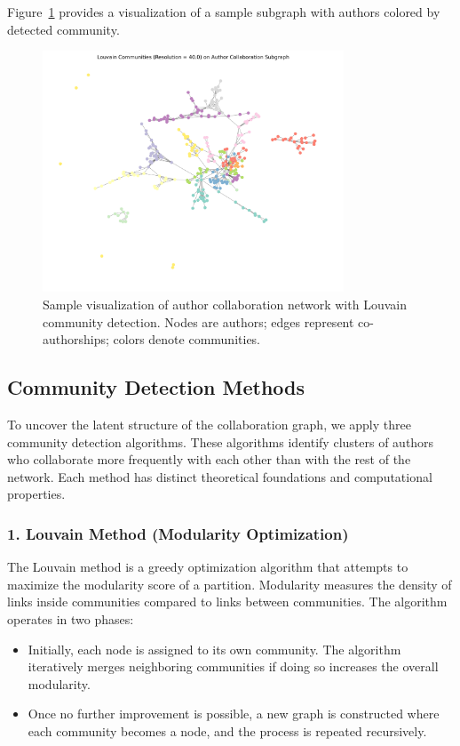 \documentclass[12pt]{article}
\begin{document}
\vspace{0.3cm}
Figure~\ref{fig:collab} provides a visualization of a sample subgraph with authors colored by detected community.

\begin{figure}[H]
    \centering
    \includegraphics[width=0.8\textwidth]{pictures/collab_graph_louvain_sample.png}
    \caption{Sample visualization of author collaboration network with Louvain community detection. Nodes are authors; edges represent co-authorships; colors denote communities.}
    \label{fig:collab}
\end{figure}

\subsection{Community Detection Methods}

To uncover the latent structure of the collaboration graph, we apply three community detection algorithms. These algorithms identify clusters of authors who collaborate more frequently with each other than with the rest of the network. Each method has distinct theoretical foundations and computational properties.

\subsubsection*{1. Louvain Method (Modularity Optimization)}

The Louvain method is a greedy optimization algorithm that attempts to maximize the modularity score of a partition. Modularity measures the density of links inside communities compared to links between communities. The algorithm operates in two phases:
\begin{itemize}
    \item Initially, each node is assigned to its own community. The algorithm iteratively merges neighboring communities if doing so increases the overall modularity.
    \item Once no further improvement is possible, a new graph is constructed where each community becomes a node, and the process is repeated recursively.
\end{itemize}
\end{document}
